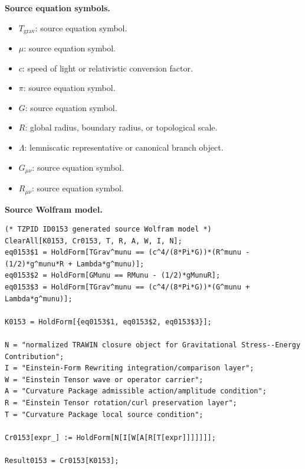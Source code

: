 \begin{minipage}[t]{0.49\linewidth}
\begingroup
\small
\raggedright
\textbf{Source equation symbols.}\par
\begin{itemize}[leftmargin=1.35em,itemsep=1pt,topsep=1pt,parsep=0pt]
    \item $T_{\mathrm{grav}}$: source equation symbol.
    \item $\mu$: source equation symbol.
    \item $c$: speed of light or relativistic conversion factor.
    \item $\pi$: source equation symbol.
    \item $G$: source equation symbol.
    \item $R$: global radius, boundary radius, or topological scale.
    \item $\Lambda$: lemniscatic representative or canonical branch object.
    \item $G_{\mu\nu}$: source equation symbol.
    \item $R_{\mu\nu}$: source equation symbol.
\end{itemize}
\endgroup
\end{minipage}\hfill
\begin{minipage}[t]{0.47\linewidth}
\begingroup
\scriptsize
\raggedright
\textbf{Source Wolfram model.}\par
\begin{Verbatim}[fontsize=\tiny,breaklines=true,breakanywhere=true]
(* TZPID ID0153 generated source Wolfram model *)
ClearAll[K0153, Cr0153, T, R, A, W, I, N];
eq0153$1 = HoldForm[TGrav^munu == (c^4/(8*Pi*G))*(R^munu - (1/2)*g^munu*R + Lambda*g^munu)];
eq0153$2 = HoldForm[GMunu == RMunu - (1/2)*gMunuR];
eq0153$3 = HoldForm[TGrav^munu == (c^4/(8*Pi*G))*(G^munu + Lambda*g^munu)];

K0153 = HoldForm[{eq0153$1, eq0153$2, eq0153$3}];

N = "normalized TRAWIN closure object for Gravitational Stress--Energy Contribution";
I = "Einstein-Form Rewriting integration/comparison layer";
W = "Einstein Tensor wave or operator carrier";
A = "Curvature Package admissible action/amplitude condition";
R = "Einstein Tensor rotation/curl preservation layer";
T = "Curvature Package local source condition";

Cr0153[expr_] := HoldForm[N[I[W[A[R[T[expr]]]]]]];

Result0153 = Cr0153[K0153];
\end{Verbatim}
\endgroup
\end{minipage}

